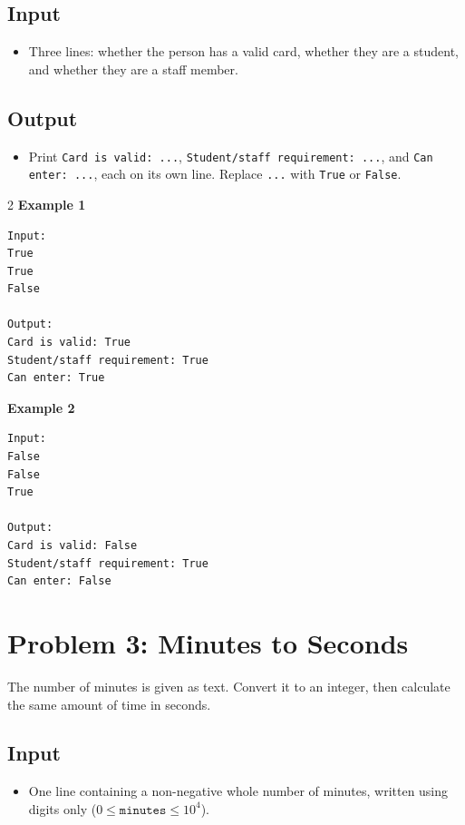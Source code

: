 \documentclass[12pt,oneside,openany]{article}
\begin{document}
\subsection*{Input}
\begin{itemize}
    \item Three lines: whether the person has a valid card, whether they are a student, and whether they are a staff member.
\end{itemize}

\subsection*{Output}
\begin{itemize}
    \item Print \texttt{Card is valid: ...}, \texttt{Student/staff requirement: ...}, and \texttt{Can enter: ...}, each on its own line. Replace \texttt{...} with \texttt{True} or \texttt{False}.
\end{itemize}
\vspace{0.2cm}

\begin{example*}{}{}
\begin{multicols}{2}
\textbf{Example 1}
\begin{verbatim}
Input:
True
True
False

Output:
Card is valid: True
Student/staff requirement: True
Can enter: True
\end{verbatim}
\textbf{Example 2}
\begin{verbatim}
Input:
False
False
True

Output:
Card is valid: False
Student/staff requirement: True
Can enter: False
\end{verbatim}
\end{multicols}
\end{example*}
\newpage
\section*{Problem 3: Minutes to Seconds}

The number of minutes is given as text. Convert it to an integer, then calculate the same amount of time in seconds.

\subsection*{Input}
\begin{itemize}
    \item One line containing a non-negative whole number of minutes, written using digits only ($0 \leq \texttt{minutes} \leq 10^4$).
\end{itemize}
\end{document}
